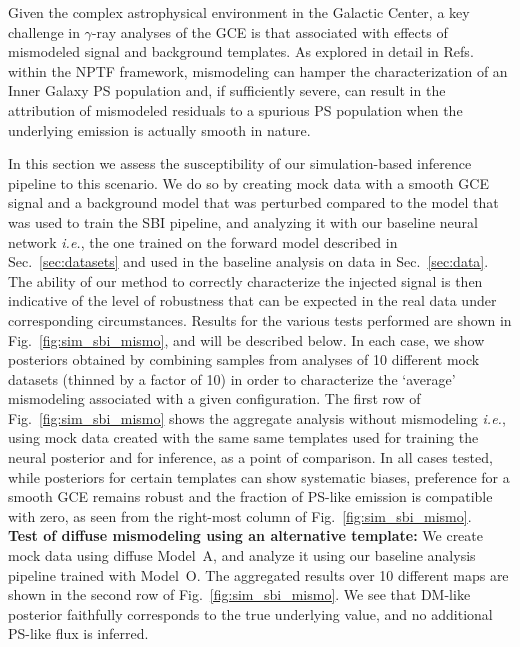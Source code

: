 \documentclass[prd,aps,10pt,nofootinbib,twocolumn,superscriptaddress,preprintnumbers,balancelastpage,longbibliography,floatfix]{revtex4-2}
\begin{document}
Given the complex astrophysical environment in the Galactic Center, a key challenge in $\gamma$-ray analyses of the GCE is that associated with effects of mismodeled signal and background templates. As explored in detail in Refs.~\cite{Lee:2015fea,Leane:2020pfc,Leane:2020nmi,Buschmann:2020adf,Chang:2019ars} within the NPTF framework, mismodeling can hamper the characterization of an Inner Galaxy PS population and, if sufficiently severe, can result in the attribution of mismodeled residuals to a spurious PS population when the underlying emission is actually smooth in nature. 

In this section we assess the susceptibility of our simulation-based inference pipeline to this scenario. We do so by creating mock data with a smooth GCE signal and a background model that was perturbed compared to the model that was used to train the SBI pipeline, and analyzing it with our baseline neural network \emph{i.e.}, the one trained on the forward model described in Sec.~\ref{sec:datasets} and used in the baseline analysis on data in Sec.~\ref{sec:data}. The ability of our method to correctly characterize the injected signal is then indicative of the level of robustness that can be expected in the real data under corresponding circumstances. Results for the various tests performed are shown in Fig.~\ref{fig:sim_sbi_mismo}, and will be described below. In each case, we show posteriors obtained by combining samples from analyses of 10 different mock datasets (thinned by a factor of 10) in order to characterize the `average' mismodeling associated with a given configuration. The first row of Fig.~\ref{fig:sim_sbi_mismo} shows the aggregate analysis without mismodeling \emph{i.e.}, using mock data created with the same same templates used for training the neural posterior and for inference, as a point of comparison. In all cases tested, while posteriors for certain templates can show systematic biases, preference for a smooth GCE remains robust and the fraction of PS-like emission is compatible with zero, as seen from the right-most column of Fig.~\ref{fig:sim_sbi_mismo}. \\

\noindent
\textbf{Test of diffuse mismodeling using an alternative template:}
We create mock data using diffuse {Model~A}, and analyze it using our baseline analysis pipeline trained with {Model~O}. The aggregated results over 10 different maps are shown in the second row of Fig.~\ref{fig:sim_sbi_mismo}. We see that DM-like posterior faithfully corresponds to the true underlying value, and no additional PS-like flux is inferred. \\
\end{document}
